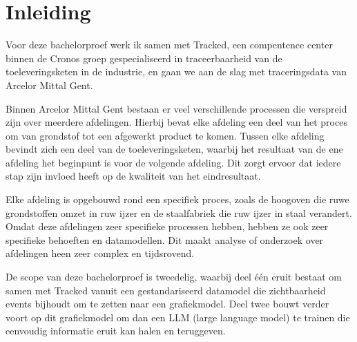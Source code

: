 


% 
\section{Inleiding}%
\label{sec:inleiding}
Voor deze bachelorproef werk ik samen met Tracked, een compentence center binnen de Cronos groep gespecialiseerd in traceerbaarheid van de toeleveringsketen in de industrie, en gaan we aan de slag met traceringsdata van Arcelor Mittal Gent.

Binnen Arcelor Mittal Gent bestaan er veel verschillende processen die verspreid zijn over meerdere afdelingen.
Hierbij bevat elke afdeling een deel van het proces om van grondstof tot een afgewerkt product te komen. 
Tussen elke afdeling bevindt zich een deel van de toeleveringsketen, waarbij het resultaat van de ene afdeling het beginpunt is voor de volgende afdeling.
Dit zorgt ervoor dat iedere stap zijn invloed heeft op de kwaliteit van het eindresultaat.

Elke afdeling is opgebouwd rond een specifiek proces, zoals de hoogoven die ruwe grondstoffen omzet in ruw ijzer en de staalfabriek die ruw ijzer in staal verandert.
Omdat deze afdelingen zeer specifieke processen hebben, hebben ze ook zeer specifieke behoeften en datamodellen.
Dit maakt analyse of onderzoek over afdelingen heen zeer complex en tijdsrovend.

De scope van deze bachelorproef is tweedelig, waarbij deel één eruit bestaat om samen met Tracked vanuit een gestandariseerd datamodel die zichtbaarheid events bijhoudt om te zetten naar een grafiekmodel.
Deel twee bouwt verder voort op dit grafiekmodel om dan een LLM (large language model) te trainen die eenvoudig informatie eruit kan halen en teruggeven.

